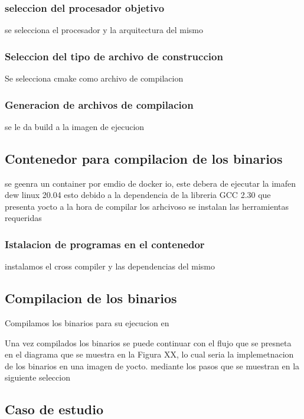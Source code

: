 \subsubsection{seleccion del procesador objetivo}

se selecciona el procesador y la arquitectura del mismo

\subsubsection{Seleccion del tipo de archivo de construccion}

Se selecciona cmake como archivo de compilacion 

\subsubsection{Generacion de archivos de compilacion}

se le da build a la imagen de ejecucion

\subsection{Contenedor para compilacion de los binarios}

se geenra un container por emdio de docker io, este debera de ejecutar la imafen dew linux 20.04 esto debido a la dependencia de la libreria GCC 2.30 que presenta yocto a la hora de compilar los arhcivoso
se instalan las herramientas requeridas

\subsubsection{Istalacion de programas en el contenedor}

instalamos el cross compiler y las dependencias del mismo

\subsection{Compilacion de los binarios}

Compilamos los binarios para su ejecucion en

Una vez compilados los binarios se puede continuar con el flujo que se presneta en el diagrama que se muestra en la Figura XX, lo cual seria la implemetnacion de los binarios en una imagen de yocto. mediante los pasos que se muestran en la siguiente seleccion


\subsection{Caso de estudio}



